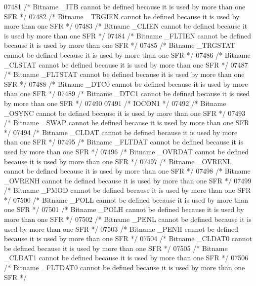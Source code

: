 \begin{DoxyCode}
07481 \textcolor{comment}{/* Bitname \_ITB cannot be defined because it is used by more than one SFR */}
07482 \textcolor{comment}{/* Bitname \_TRGIEN cannot be defined because it is used by more than one SFR */}
07483 \textcolor{comment}{/* Bitname \_CLIEN cannot be defined because it is used by more than one SFR */}
07484 \textcolor{comment}{/* Bitname \_FLTIEN cannot be defined because it is used by more than one SFR */}
07485 \textcolor{comment}{/* Bitname \_TRGSTAT cannot be defined because it is used by more than one SFR */}
07486 \textcolor{comment}{/* Bitname \_CLSTAT cannot be defined because it is used by more than one SFR */}
07487 \textcolor{comment}{/* Bitname \_FLTSTAT cannot be defined because it is used by more than one SFR */}
07488 \textcolor{comment}{/* Bitname \_DTC0 cannot be defined because it is used by more than one SFR */}
07489 \textcolor{comment}{/* Bitname \_DTC1 cannot be defined because it is used by more than one SFR */}
07490 
07491 \textcolor{comment}{/* IOCON1 */}
07492 \textcolor{comment}{/* Bitname \_OSYNC cannot be defined because it is used by more than one SFR */}
07493 \textcolor{comment}{/* Bitname \_SWAP cannot be defined because it is used by more than one SFR */}
07494 \textcolor{comment}{/* Bitname \_CLDAT cannot be defined because it is used by more than one SFR */}
07495 \textcolor{comment}{/* Bitname \_FLTDAT cannot be defined because it is used by more than one SFR */}
07496 \textcolor{comment}{/* Bitname \_OVRDAT cannot be defined because it is used by more than one SFR */}
07497 \textcolor{comment}{/* Bitname \_OVRENL cannot be defined because it is used by more than one SFR */}
07498 \textcolor{comment}{/* Bitname \_OVRENH cannot be defined because it is used by more than one SFR */}
07499 \textcolor{comment}{/* Bitname \_PMOD cannot be defined because it is used by more than one SFR */}
07500 \textcolor{comment}{/* Bitname \_POLL cannot be defined because it is used by more than one SFR */}
07501 \textcolor{comment}{/* Bitname \_POLH cannot be defined because it is used by more than one SFR */}
07502 \textcolor{comment}{/* Bitname \_PENL cannot be defined because it is used by more than one SFR */}
07503 \textcolor{comment}{/* Bitname \_PENH cannot be defined because it is used by more than one SFR */}
07504 \textcolor{comment}{/* Bitname \_CLDAT0 cannot be defined because it is used by more than one SFR */}
07505 \textcolor{comment}{/* Bitname \_CLDAT1 cannot be defined because it is used by more than one SFR */}
07506 \textcolor{comment}{/* Bitname \_FLTDAT0 cannot be defined because it is used by more than one SFR */}

\end{DoxyCode}
